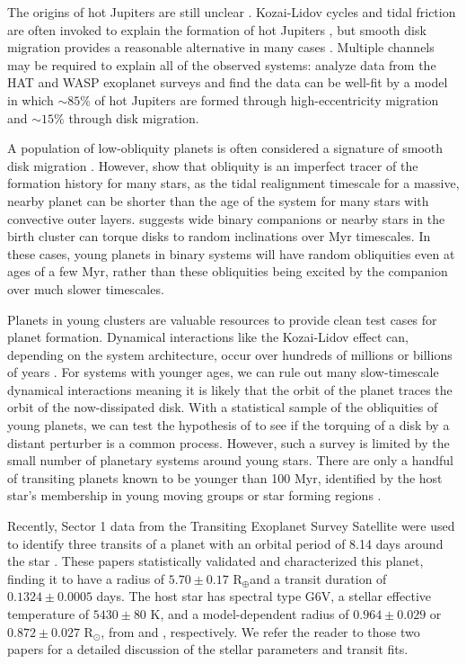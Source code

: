 \documentclass[twocolumn]{aastex63}
\newcommand{\tess}{{\it TESS}}
\newcommand{\rearth}{{R$_\oplus$}}
\newcommand{\rsun}{{R$_\odot$}}
\begin{document}
The origins of hot Jupiters are still unclear \citep{Dawson18}.
Kozai-Lidov cycles and tidal friction are often invoked to explain the formation of hot Jupiters \citep{Fabrycky07}, but smooth disk migration provides a reasonable alternative in many cases \citep{Ida08}. 
Multiple channels may be required to explain all of the observed systems: \citet{Nelson17} analyze data from the HAT and WASP exoplanet surveys and find the data can be well-fit by a model in which $\sim85\%$ of hot Jupiters are formed through high-eccentricity migration and $\sim15\%$ through disk migration.

A population of low-obliquity planets is often considered a signature of smooth disk migration \citep{Morton11a, Ford14}. However, \citet{Albrecht12} show that obliquity is an imperfect tracer of the formation history for many stars, as the tidal realignment timescale for a massive, nearby planet can be shorter than the age of the system for many stars with convective outer layers.
\citet{Batygin12} suggests wide binary companions or nearby stars in the birth cluster can torque disks to random inclinations over Myr timescales. In these cases, young planets in binary systems will have random obliquities even at ages of a few Myr, rather than these obliquities being excited by the companion over much slower timescales.


Planets in young clusters are valuable resources to provide clean test cases for planet formation. 
Dynamical interactions like the Kozai-Lidov effect can, depending on the system architecture, occur over hundreds of millions or billions of years \citep{Montet15c, Naoz16}. 
For systems with younger ages, we can rule out many slow-timescale dynamical interactions meaning it is likely that the orbit of the planet traces the orbit of the now-dissipated disk. 
With a statistical sample of the obliquities of young planets, we can test the hypothesis of \citet{Batygin12} to see if the torquing of a disk by a distant perturber is a common process. However, such a survey is limited by the small number of planetary systems around young stars. There are only a handful of transiting planets known to be younger than 100 Myr, identified by the host star's membership in young moving groups or star forming regions \citep{David16, Mann16, David19}.

Recently, Sector 1 data from the Transiting Exoplanet Survey Satellite \citep[\tess, ][]{Ricker14} were used to identify three transits of a planet with an orbital period of 8.14 days around the star  \citep{Benatti19, Newton19}. 
These papers statistically validated and characterized this planet, finding it to have a radius of $5.70 \pm 0.17$ \rearth and a transit duration of $0.1324 \pm 0.0005$ days. 
The host star has spectral type G6V, a stellar effective temperature of $5430 \pm 80$ K, and a model-dependent radius of $0.964 \pm 0.029$ or $0.872 \pm 0.027$ \rsun, from \citet{Newton19} and \citet{Benatti19}, respectively.
We refer the reader to those two papers for a detailed discussion of the stellar parameters and transit fits.
\end{document}
